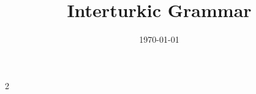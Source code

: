 \documentclass[12pt, oneside]{book}
\title{Interturkic Grammar}
\author{}
\date{\today}
\begin{document}
	\maketitle

	\frontmatter
	\setlength{\parskip}{0pt} %
	\tableofcontents
	\listoftables

	\newpage %

	\begin{multicols}{2}
		\printglosses[style=block]
	\end{multicols}

	\mainmatter
	\setlength{\parskip}{6pt} %
	
	
	
	
	
	
\end{document}
